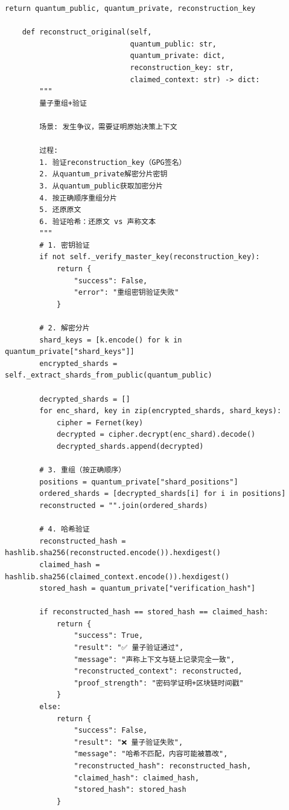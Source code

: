 \begin{lstlisting}[style=python,
  caption={量子指纹生成器（v4.0新增，密码学模拟量子态）
    · DNA: \#龍芯⚡️2026-03-10-QUANTUM-v4.0},
  label={lst:quantum}]
        return quantum_public, quantum_private, reconstruction_key
    
    def reconstruct_original(self,
                             quantum_public: str,
                             quantum_private: dict,
                             reconstruction_key: str,
                             claimed_context: str) -> dict:
        """
        量子重组+验证
        
        场景: 发生争议，需要证明原始决策上下文
        
        过程:
        1. 验证reconstruction_key（GPG签名）
        2. 从quantum_private解密分片密钥
        3. 从quantum_public获取加密分片
        4. 按正确顺序重组分片
        5. 还原原文
        6. 验证哈希：还原文 vs 声称文本
        """
        # 1. 密钥验证
        if not self._verify_master_key(reconstruction_key):
            return {
                "success": False,
                "error": "重组密钥验证失败"
            }
        
        # 2. 解密分片
        shard_keys = [k.encode() for k in quantum_private["shard_keys"]]
        encrypted_shards = self._extract_shards_from_public(quantum_public)
        
        decrypted_shards = []
        for enc_shard, key in zip(encrypted_shards, shard_keys):
            cipher = Fernet(key)
            decrypted = cipher.decrypt(enc_shard).decode()
            decrypted_shards.append(decrypted)
        
        # 3. 重组（按正确顺序）
        positions = quantum_private["shard_positions"]
        ordered_shards = [decrypted_shards[i] for i in positions]
        reconstructed = "".join(ordered_shards)
        
        # 4. 哈希验证
        reconstructed_hash = hashlib.sha256(reconstructed.encode()).hexdigest()
        claimed_hash = hashlib.sha256(claimed_context.encode()).hexdigest()
        stored_hash = quantum_private["verification_hash"]
        
        if reconstructed_hash == stored_hash == claimed_hash:
            return {
                "success": True,
                "result": "✅ 量子验证通过",
                "message": "声称上下文与链上记录完全一致",
                "reconstructed_context": reconstructed,
                "proof_strength": "密码学证明+区块链时间戳"
            }
        else:
            return {
                "success": False,
                "result": "❌ 量子验证失败",
                "message": "哈希不匹配，内容可能被篡改",
                "reconstructed_hash": reconstructed_hash,
                "claimed_hash": claimed_hash,
                "stored_hash": stored_hash
            }
    

\end{lstlisting}
